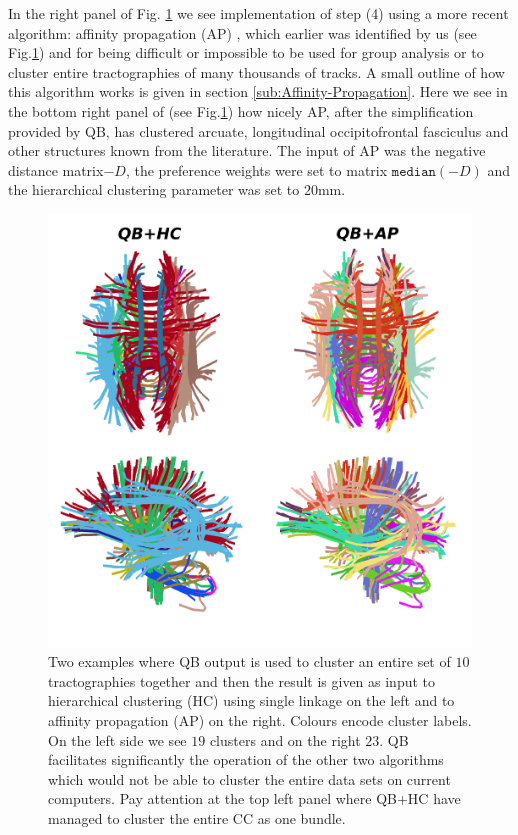 \documentclass[preprint,authoryear,a4paper,10pt,onecolumn]{elsarticle}
\begin{document}
In the right panel of Fig. \ref{Flo:LSC+HC+AP} we see implementation
of step (4) using a more recent algorithm: affinity propagation (AP)
\cite{dueck2009affinity}, which earlier was identified by us (see
Fig.\ref{Flo:LSC+HC+AP}) and \cite{malcolm2009filtered} for being
difficult or impossible to be used for group analysis or to cluster
entire tractographies of many thousands of tracks. A small outline
of how this algorithm works is given in section \ref{sub:Affinity-Propagation}.
Here we see in the bottom right panel of (see Fig.\ref{Flo:LSC+HC+AP})
how nicely AP, after the simplification provided by QB, has clustered
arcuate, longitudinal occipitofrontal fasciculus and other structures
known from the literature. The input of AP was the negative distance
matrix$-D$, the preference weights were set to matrix $\mathtt{median}(-D)$
and the hierarchical clustering parameter was set to $20$mm.

%
\begin{figure}
\begin{centering}
\includegraphics[scale=0.7]{last_figures/LSC_with_others}
\par\end{centering}

\label{Flo:LSC+HC+AP}
\caption{Two examples where QB output is used to cluster an entire set
  of $10$ tractographies together and then the result is given as input
  to hierarchical clustering (HC) using single linkage on the left and
  to affinity propagation (AP) on the right. Colours encode cluster
  labels. On the left side we see $19$ clusters and on the right
  $23$. QB facilitates significantly the operation of the other two
  algorithms which would not be able to cluster the entire data sets on
  current computers. Pay attention at the top left panel where QB+HC
  have managed to cluster the entire CC as one bundle.}

\end{figure}
\end{document}
